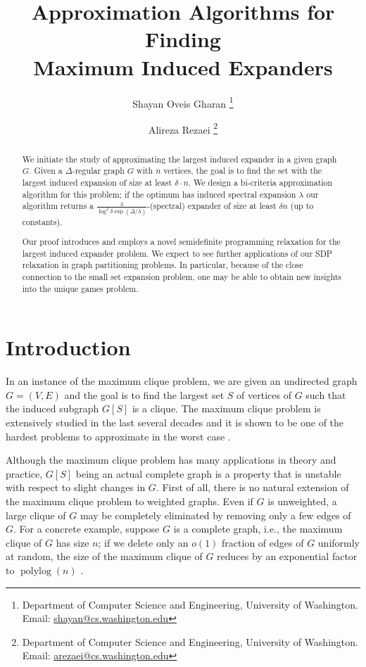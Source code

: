 \documentclass[11pt]{article}
\title{Approximation Algorithms for Finding\\ Maximum  Induced Expanders}
\author{
Shayan Oveis Gharan
\thanks{Department of Computer Science and Engineering, University of Washington.
Email: \protect\url{shayan@cs.washington.edu}}
\and
Alireza Rezaei
\thanks{Department of Computer Science and Engineering, University of Washington.
Email: \protect\url{arezaei@cs.washington.edu}}
}
\DeclareMathOperator{\polylog}{polylog}
\begin{document}
\maketitle

\begin{abstract}
	We initiate the study of approximating the largest induced expander in a given graph $G$. Given a $\Delta$-regular graph $G$ with $n$ vertices, the goal is to find the set with the largest induced expansion of size at least $\delta \cdot n$. We design a bi-criteria approximation algorithm for this problem; if the optimum has induced spectral expansion $\lambda$ our algorithm returns a $\frac{\lambda}{\log^2\delta \exp(\Delta/\lambda)}$-(spectral) expander of size at least $\delta n$ (up to constants).

	Our proof introduces and employs a novel semidefinite programming relaxation for the largest induced expander problem. We expect to see further applications of our SDP relaxation in  graph partitioning problems. In particular, because of the close connection to the small set expansion problem, one may be able to obtain new insights into the unique games problem.
\end{abstract}







\section{Introduction}
In an instance of the maximum clique problem, we are given an undirected graph $G=(V,E)$ and the goal is to find the largest set $S$ of vertices of $G$ such that the induced subgraph $G[S]$ is a clique. The maximum clique problem is extensively studied in the last several decades and it is shown to be one of the hardest problems to approximate in the worst case \cite{Has96}.  

Although the maximum clique problem has many applications in theory and practice,  $G[S]$ being an actual complete graph is a property that is  unstable with respect to slight changes in $G$. First of all, there is no natural extension of the maximum clique problem to weighted graphs. Even if $G$ is unweighted, a large clique of $G$ may be completely eliminated by removing only a few edges of $G$.  For a concrete example, suppose $G$ is a complete graph, i.e., the maximum clique of $G$ has size $n$; if we delete only an $o(1)$ fraction of edges of $G$ uniformly at random, the size of the maximum clique of $G$ reduces by an exponential factor to $\polylog(n)$ \cite{GM75,BE76}. 
\end{document}
